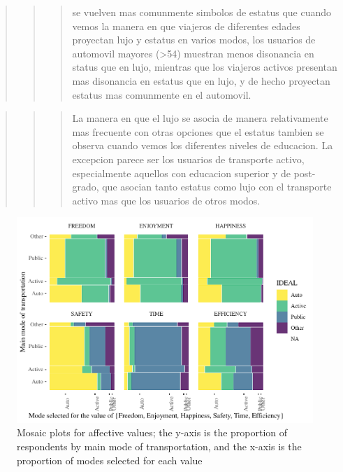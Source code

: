 \documentclass[]{elsarticle} %
\makeatletter
\def\maxwidth{\ifdim\Gin@nat@width>\linewidth\linewidth
\else\Gin@nat@width\fi}
\let\Oldincludegraphics\includegraphics
\renewcommand{\includegraphics}[1]{\Oldincludegraphics[width=\maxwidth]{#1}}
\makeatother
\begin{document}
\begin{quote}
\begin{quote}
\begin{quote}
se vuelven mas comunmente simbolos de estatus que cuando vemos la manera
en que viajeros de diferentes edades proyectan lujo y estatus en varios
modos, los usuarios de automovil mayores (\textgreater54) muestran menos
disonancia en status que en lujo, mientras que los viajeros activos
presentan mas disonancia en estatus que en lujo, y de hecho proyectan
estatus mas comunmente en el automovil.
\end{quote}
\end{quote}
\end{quote}

\begin{quote}
\begin{quote}
\begin{quote}
La manera en que el lujo se asocia de manera relativamente mas frecuente
con otras opciones que el estatus tambien se observa cuando vemos los
diferentes niveles de educacion. La excepcion parece ser los usuarios de
transporte activo, especialmente aquellos con educacion superior y de
post-grado, que asocian tanto estatus como lujo con el transporte activo
mas que los usuarios de otros modos.
\end{quote}
\end{quote}
\end{quote}

\begin{figure}
\centering
\includegraphics{Dissonance_Santiago_v1_files/figure-latex/figure-mosaic-plots-by-attribute-1.pdf}
\caption{\label{fig:mosaic-plots-by-attribute}Mosaic plots for affective
values; the y-axis is the proportion of respondents by main mode of
transportation, and the x-axis is the proportion of modes selected for
each value}
\end{figure}
\end{document}
